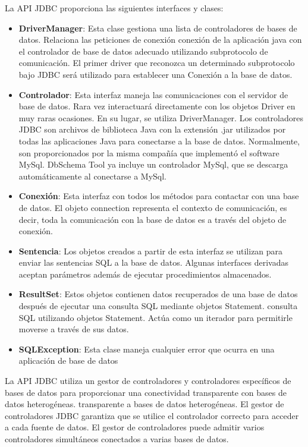 \documentclass[10pt,a4paper]{article}
\begin{document}
\normalsize{
La API JDBC proporciona las siguientes interfaces y clases:
\begin{itemize}
\item \textbf{DriverManager}: Esta clase gestiona una lista de controladores de bases de datos. Relaciona las peticiones de conexión
conexión de la aplicación java con el controlador de base de datos adecuado utilizando
subprotocolo de comunicación. El primer driver que reconozca un determinado subprotocolo
bajo JDBC será utilizado para establecer una Conexión a la base de datos.

\item \textbf{Controlador}: Esta interfaz maneja las comunicaciones con el servidor de base de datos. Rara vez
interactuará directamente con los objetos Driver en muy raras ocasiones. En su lugar, se utiliza DriverManager. Los controladores JDBC son archivos de biblioteca Java con la extensión .jar utilizados por todas las aplicaciones Java para conectarse a la base de datos. Normalmente, son proporcionados por la misma compañía que implementó el software MySql. DbSchema Tool ya incluye un controlador MySql, que se descarga automáticamente al conectarse a MySql.

\item \textbf{Conexión}: Esta interfaz con todos los métodos para contactar con una base de datos. El objeto connection
representa el contexto de comunicación, es decir, toda la comunicación con la base de datos es
a través del objeto de conexión.

\item \textbf{Sentencia}: Los objetos creados a partir de esta interfaz se utilizan para enviar las sentencias SQL a la base de datos. Algunas interfaces derivadas aceptan parámetros además de ejecutar
procedimientos almacenados.

\item \textbf{ResultSet}: Estos objetos contienen datos recuperados de una base de datos después de ejecutar una consulta SQL mediante objetos Statement.
consulta SQL utilizando objetos Statement. Actúa como un iterador para permitirle moverse a través de
sus datos.

\item \textbf{SQLException}: Esta clase maneja cualquier error que ocurra en una aplicación de base de datos
\end{itemize}
La API JDBC utiliza un gestor de controladores y controladores específicos de bases de datos para proporcionar una conectividad transparente con bases de datos heterogéneas.
transparente a bases de datos heterogéneas.
El gestor de controladores JDBC garantiza que se utilice el controlador correcto para acceder a cada fuente de datos.
El gestor de controladores puede admitir varios controladores simultáneos conectados a varias bases de datos.

}
\end{document}
